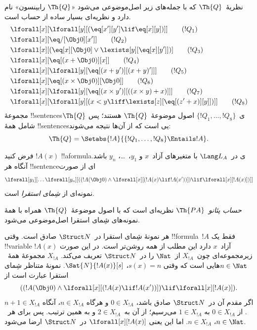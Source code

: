 \documentclass[../../../include/open-logic-section]{subfiles}
\begin{document}
\begin{defn}
نظریهٔ~$\Th{Q}$ که با جمله‌های زیر اصل‌موضوعی می‌شود «$\Th{Q}$
رابینسون» نام دارد و نظریه‌ای بسیار ساده از حساب است.
\begin{align*}
& \lforall[x][\lforall[y][(\eq[x'][y'] \lif \eq[x][y])]] \tag{$!Q_1$}\\
& \lforall[x][\eq/[\Obj 0][x']] \tag{$!Q_2$}\\
& \lforall[x][(\eq[x][\Obj 0] \lor \lexists[y][\eq[x][y']])] \tag{$!Q_3$}\\
& \lforall[x][\eq[(x + \Obj 0)][x]] \tag{$!Q_4$}\\
& \lforall[x][\lforall[y][\eq[(x + y')][(x + y)']]] \tag{$!Q_5$}\\
& \lforall[x][\eq[(x \times \Obj 0)][\Obj 0]] \tag{$!Q_6$}\\
& \lforall[x][\lforall[y][\eq[(x \times y')][((x \times y) + x)]]] \tag{$!Q_7$}\\
& \lforall[x][\lforall[y][(x < y \liff \lexists[z][\eq[(z' + x)][y]])]] \tag{$!Q_8$}
\end{align*}
مجموعهٔ !!{sentence}sی~$\{!Q_1,\dots,!Q_8\}$ اصول موضوعهٔ~$\Th{Q}$ هستند؛
پس $\Th{Q}$ شامل همهٔ !!{sentence}sیی است که از آن‌ها نتیجه می‌شوند:
\[
\Th{Q} = \Setabs{!A}{\{!Q_1, \dots, !Q_8\} \Entails !A}.
\]
\end{defn}

\begin{defn}
فرض کنید $!A(x)$ !!a{formula}ی در~$\Lang L_A$ با متغیرهای آزاد~$x$ و
$y_1$،~\dots، $y_n$ باشد. آنگاه هر !!{sentence}ای از صورت
\[
\lforall[y_1][\dots\lforall[y_n][((!A(\Obj 0) \land \lforall[x][(!A(x)
\lif !A(x'))]) \lif \lforall[x][!A(x)])]]
\]
نمونه‌ای از \emph{شِمای استقرا} است.

\emph{حساب پئانو}~$\Th{PA}$ نظریه‌ای است که با اصول موضوعهٔ~$\Th{Q}$
همراه با همهٔ نمونه‌های شِمای استقرا اصل‌موضوعی می‌شود.
\end{defn}

\begin{explain}
هر نمونهٔ شِمای استقرا در~$\Struct N$ صادق است. وقتی !!{formula}~$!A$
فقط یک !!{variable} آزاد~$x$ دارد این مطلب از همه روشن‌تر است. در این
صورت $!A(x)$ زیرمجموعه‌ای چون~$X_{!A}$ از~$\Nat$ را در~$\Struct N$
تعریف می‌کند. $X_{!A}$ مجموعهٔ همهٔ~$n\in\Nat$هایی است که وقتی
$s(x)=n$، $\Sat{N}{!A(x)}[s]$. نمونهٔ متناظر شِمای استقرا عبارت است از
\[
((!A(\Obj 0) \land \lforall[x][(!A(x) \lif !A(x'))]) \lif
  \lforall[x][!A(x)]).
\]
اگر مقدم آن در~$\Struct N$ صادق باشد، $0\in X_{!A}$ و هرگاه
$n\in X_{!A}$، آنگاه $n+1\in X_{!A}$. از $0\in X_{!A}$ به
$1\in X_{!A}$ می‌رسیم؛ از آن به~$2\in X_{!A}$ و به همین ترتیب. پس
برای هر~$n\in\Nat$، $n\in X_{!A}$. اما این یعنی
$\lforall[x][!A(x)]$ در~$\Struct N$ ارضا می‌شود.
\end{explain}
\end{document}
